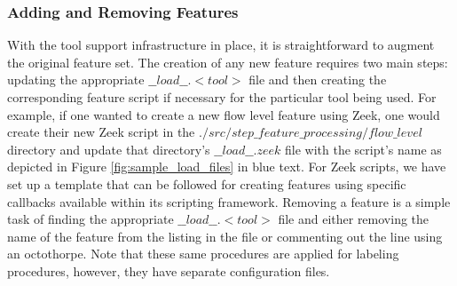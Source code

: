 \documentclass[sigconf]{acmart}
\begin{document}
\subsubsection{Adding and Removing Features}\label{subsubsec:adding_removing_features}
With the tool support infrastructure in place, it is straightforward to augment the original feature set.
The creation of any new feature requires two main steps:  updating the appropriate $\_\_load\_\_.<tool>$ file and then creating the corresponding feature script if necessary for the particular tool being used.
For example, if one wanted to create a new flow level feature using Zeek, one would create their new Zeek script in the $./src/step\_feature\_processing/flow\_level$ directory and update that directory's $\_\_load\_\_.zeek$ file with the script's name as depicted in Figure \ref{fig:sample_load_files} in blue text.
For Zeek scripts, we have set up a template that can be followed for creating features using specific callbacks available within its scripting framework.
Removing a feature is a simple task of finding the appropriate $\_\_load\_\_.<tool>$ file and either removing the name of the feature from the listing in the file or commenting out the line using an octothorpe.
Note that these same procedures are applied for labeling procedures, however, they have separate configuration files.
\end{document}
